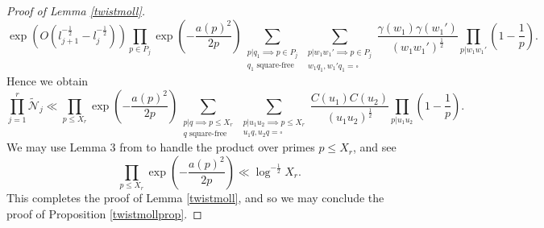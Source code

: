 \documentclass[12pt]{amsart}
\numberwithin{equation}{section}
\numberwithin{thm}{section}
\newcommand{\1}{\mathbf 1}
\begin{document}
\begin{proof}[Proof of Lemma \ref{twistmoll}]
	\begin{equation}
		\exp\left(O(l_{j+1}^{-\frac{1}{2}}-l_{j}^{-\frac{1}{2}})\right)\prod_{p\in P_j}\exp\left(-\frac{a(p)^2}{2p}\right)\sum_{\substack{p|q_1\implies p\in P_{j}\\ q_1\text{ square-free}}}\sum_{\substack{p|w_1w_1'\implies p\in P_{j}\\ w_1q_1,w_1'q_1=\square}}
		\frac{\gamma(w_1)\gamma(w_1')}{(w_1w_1')^{\frac{1}{2}}} \prod_{p|w_1w_1'} 	\left(1-\frac{1}{p}\right).
	\end{equation}
	Hence we obtain \begin{equation}
		\prod^r_{j=1}\tilde{\mathscr{N}}_{j}\ll \prod_{p\le X_r} \exp\left(-\frac{a(p)^2}{2p}\right)\sum_{\substack{p|q\implies p\le X_r\\ q\text{ square-free}}}\sum_{\substack{p|u_1u_2\implies p\le X_r\\ u_1q,u_2q=\square}} \frac{C(u_1)C(u_2)}{(u_1u_2)^{\frac{1}{2}}}\prod_{p|u_1u_2}\left(1-\frac{1}{p
		}\right).
	\end{equation}
	We may use Lemma 3 from \cite{RS2} to handle the product over primes $p\le X_r$, and see \begin{equation}\prod_{p\le X_r} \exp\left(-\frac{a(p)^2}{2p}\right)\ll \log^{-\frac{1}{2}}X_r.\end{equation} This completes the proof of Lemma \ref{twistmoll}, and so we may conclude the proof of Proposition \ref{twistmollprop}.

	\end{proof}
\end{document}

